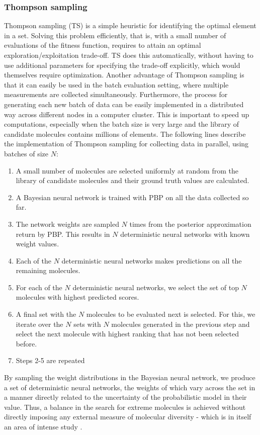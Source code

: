 \subsubsection{Thompson sampling}

Thompson sampling (TS) \cite{Thompson_1933} is a simple heuristic for identifying the optimal element in a set. Solving this problem efficiently, that is, with a small number of evaluations of the fitness function, requires to attain an optimal exploration/exploitation trade-off. TS does this automatically, without having to use additional parameters for specifying the trade-off explicitly, which would themselves require optimization. Another advantage of Thompson sampling is that it can easily be used
in the batch evaluation setting, where multiple measurements are collected simultaneously. Furthermore, the process for generating each new batch of data can be easily implemented in a distributed way across different nodes in a computer cluster. This is important to speed up computations, especially when the batch size is very large and the library of candidate molecules contains millions of elements. The following lines describe the implementation of Thompson sampling for collecting data in parallel, using batches of size $N$:
\begin{enumerate}
\item A small number of molecules are selected uniformly at random from the library of candidate molecules and their ground truth values are calculated.
\item A Bayesian neural network is trained with PBP on all the data collected so far.
\item The network weights are sampled $N$ times from the posterior approximation return by PBP. This results in $N$ deterministic neural networks with known weight values.
\item Each of the $N$ deterministic neural networks makes predictions on all the remaining molecules.
\item For each of the $N$ deterministic neural networks, we select the set of top $N$ molecules with highest predicted scores.
\item A final set with the $N$ molecules to be evaluated next is selected. For this, we iterate over the $N$ sets with $N$ molecules generated in the previous step and select the next molecule with highest ranking that has not been selected before.
\item Steps 2-5 are repeated
\end{enumerate}
By sampling the weight distributions in the Bayesian neural network, we produce a set of deterministic neural networks, the weights of which vary across the set in a manner directly related to the uncertainty of the probabilistic model in their value.  Thus, a balance in the search for extreme molecules is achieved without directly imposing any external measure of molecular diversity - which is in itself an area of intense study \cite{Maldonado_2006}.